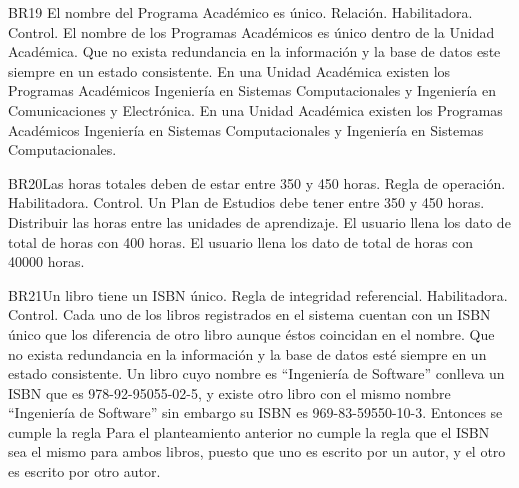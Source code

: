 \begin{BussinesRule}{BR19} {El nombre del Programa Académico es único.}
    \BRitem[Tipo: ]Relación.
    \BRitem[Clase: ]Habilitadora.
    \BRitem[Nivel: ]Control.
    \BRitem[Descripción: ]El nombre de los Programas Académicos es único dentro de la Unidad Académica.
    \BRitem[Motivación: ] Que no exista redundancia en la información y la base de datos este siempre en un estado consistente.
     En una Unidad Académica existen los Programas Académicos Ingeniería en Sistemas Computacionales y Ingeniería en Comunicaciones y Electrónica.
    En una Unidad Académica existen los Programas Académicos Ingeniería en Sistemas Computacionales y Ingeniería en Sistemas Computacionales.
\end{BussinesRule}
\begin{BussinesRule}{BR20}{Las horas totales deben de estar entre 350 y 450 horas.}
    \BRitem[Tipo: ]Regla de operación.
    \BRitem[Clase: ]Habilitadora.
    \BRitem[Nivel: ]Control.
    \BRitem[Descripción: ]Un Plan de Estudios debe tener entre 350 y 450 horas.
    \BRitem[Motivación:] Distribuir las horas entre las unidades de aprendizaje.
     El usuario llena los dato de total de horas con 400 horas.
     El usuario llena los dato de total de horas con 40000 horas.
\end{BussinesRule}
\begin{BussinesRule}{BR21}{Un libro tiene un ISBN único.}
    \BRitem[Tipo:] Regla de integridad referencial.
    \BRitem[Clase:] Habilitadora.
    \BRitem[Nivel:] Control.
    \BRitem[Descripción:] Cada uno de los libros registrados en el sistema cuentan con un ISBN único que los diferencia de otro libro aunque éstos coincidan en el nombre.
    \BRitem[Motivación:] Que no exista redundancia en la información y la base de datos esté siempre en un estado consistente.
     Un libro cuyo nombre es ``Ingeniería de Software'' conlleva un ISBN que es 978-92-95055-02-5, y existe otro libro con el mismo nombre ``Ingeniería de Software'' sin embargo su ISBN es 969-83-59550-10-3. Entonces se cumple la regla
     Para el planteamiento anterior no cumple la regla que el ISBN sea el mismo para ambos libros, puesto que uno es escrito por un autor, y el otro es escrito por otro autor.
\end{BussinesRule}

